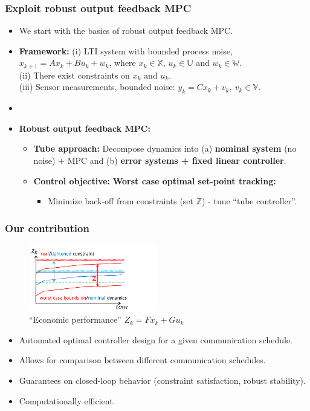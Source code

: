 \documentclass{beamer}
\begin{document}
\begin{frame}
 \frametitle{Exploit robust output feedback MPC}
 \begin{itemize}
  \item We start with the basics of robust output feedback MPC.
  \item \textbf{Framework:} (i) LTI system with bounded process noise, $x_{k+1} = A x_k + B u_k + w_k$,
  where $x_k \in \mathbb{X}$, $u_k \in \mathbb{U}$ and $w_k \in \mathbb{W}$.\\
  (ii) There exist constraints on $x_k$ and $u_k$.\\
  (iii) Sensor measurements, bounded noise: $y_k = C x_k + v_k, \ v_k \in \mathbb{V}$.
  \item[]
  \item \textbf{Robust output feedback MPC:}
  \begin{itemize}
   \item \textbf{Tube approach:} Decompose dynamics into (a) \textbf{nominal system} (no noise) + MPC
   and (b) \textbf{error systems + fixed linear controller}.
   \item \textbf{Control objective:} \textbf{Worst case optimal set-point tracking:}
   \begin{itemize}
    \item Minimize back-off from constraints (set $\mathbb{Z}$) - tune ``tube controller''.
   \end{itemize}
  \end{itemize}
 \end{itemize}
\end{frame}
\begin{frame}
 \frametitle{Our contribution}
 \vspace*{-.3in}
 \begin{figure}
\centering
\includegraphics[width=0.5\textwidth, height = .3\textheight]{tubes.png}
  \caption{{\footnotesize ``Economic performance'' $Z_k = F x_k + G u_k$}} 
\end{figure}
\vspace*{-.3in}
\begin{itemize}
 \item Automated optimal controller design for a given communication schedule.
 \item Allows for comparison between different communication schedules.
 \item Guarantees on closed-loop behavior (constraint satisfaction, robust stability).
 \item Computationally efficient.
\end{itemize}

\end{frame}
\end{document}
